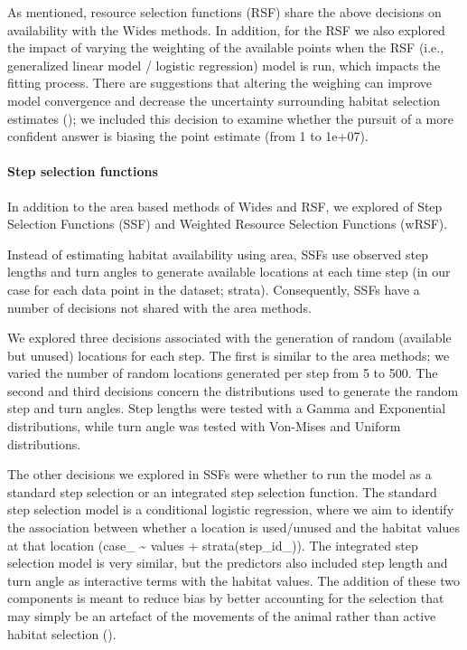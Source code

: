 \documentclass[10pt,a4paper]{article}
\begin{document}
As mentioned, resource selection functions (RSF) share the above decisions on availability with the Wides methods.
In addition, for the RSF we also explored the impact of varying the weighting of the available points when the RSF (i.e., generalized linear model / logistic regression) model is run, which impacts the fitting process.
There are suggestions that altering the weighing can improve model convergence and decrease the uncertainty surrounding habitat selection estimates (); we included this decision to examine whether the pursuit of a more confident answer is biasing the point estimate (from 1 to 1e+07).

\paragraph{Step selection functions}\label{step-selection-functions}

In addition to the area based methods of Wides and RSF, we explored of Step Selection Functions (SSF) and Weighted Resource Selection Functions (wRSF).

Instead of estimating habitat availability using area, SSFs use observed step lengths and turn angles to generate available locations at each time step (in our case for each data point in the dataset; strata).
Consequently, SSFs have a number of decisions not shared with the area methods.

We explored three decisions associated with the generation of random (available but unused) locations for each step.
The first is similar to the area methods; we varied the number of random locations generated per step from 5 to 500.
The second and third decisions concern the distributions used to generate the random step and turn angles.
Step lengths were tested with a Gamma and Exponential distributions, while turn angle was tested with Von-Mises and Uniform distributions.

The other decisions we explored in SSFs were whether to run the model as a standard step selection or an integrated step selection function.
The standard step selection model is a conditional logistic regression, where we aim to identify the association between whether a location is used/unused and the habitat values at that location (case\_ \textasciitilde{} values + strata(step\_id\_)).
The integrated step selection model is very similar, but the predictors also included step length and turn angle as interactive terms with the habitat values.
The addition of these two components is meant to reduce bias by better accounting for the selection that may simply be an artefact of the movements of the animal rather than active habitat selection ().
\end{document}
